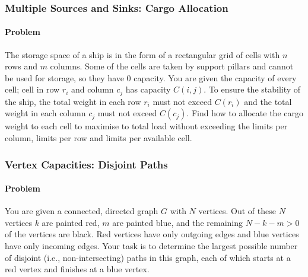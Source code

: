  \subsubsection{Multiple Sources and Sinks: Cargo Allocation}
 \paragraph{Problem} The storage space of a ship is in the form of a rectangular grid of 
 cells with \(n\)  rows and \(m\) columns. Some of the cells are taken by support pillars 
 and cannot be used for storage, so they have 0 capacity. You are given the capacity of
 every cell; cell in row \(r_i\) and column \(c_j\) has capacity \(C(i,j)\). To ensure
 the stability of the ship, the total weight in each row \(r_i\) must not exceed 
 \(C(r_i)\) and the total weight in each column \(c_j\) must not exceed \(C(c_j)\).
 Find how to allocate the cargo weight to each cell to maximise to total load without
 exceeding the limits per column, limits per row and limits per available cell.

 \subsubsection{Vertex Capacities: Disjoint Paths}
 \paragraph{Problem}
 You are given a connected, directed graph \(G\) with \(N\) vertices. Out of these \(N\)
 vertices \(k\) are painted red, \(m\) are painted blue, and the remaining \(N-k-m >0\)
 of the vertices are black. Red vertices have only outgoing edges and blue vertices have 
 only incoming edges. Your task is to determine the largest possible number of disjoint
 (i.e., non-intersecting) paths in this graph, each of which starts at a red vertex
 and finishes at a blue vertex.